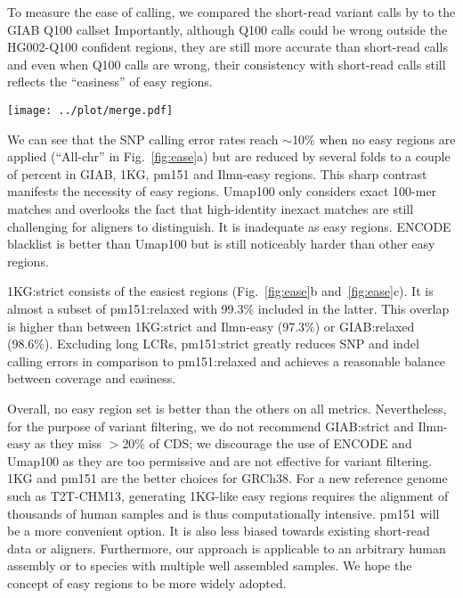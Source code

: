 \documentclass[webpdf,contemporary,large,namedate]{oup-authoring-template}%
\begin{document}
To measure the ease of calling, we compared the short-read variant calls by \citet{Baid2020.12.11.422022} to the GIAB Q100 callset
Importantly, although Q100 calls could be wrong outside the HG002-Q100 confident regions,
they are still more accurate than short-read calls
and even when Q100 calls are wrong, their consistency with short-read calls
still reflects the ``easiness'' of easy regions.

\begin{figure*}[tb]
\texttt{[image: ../plot/merge.pdf]}
\caption{Small variant calling accuracy in easy and confident regions.
{\bf (a)} SNP accuracy.
DeepVariant, Strelka2, Octopus and GATK short-read variant calls from 30X NovaSeq data were obtained from \citet{Baid2020.12.11.422022}.
Pipelup calls were made with ``{\tt minipileup -ys3 -a1 -p.25}''.
False discovery rate (FDR) and false negative rate (FNR) were calculated by RTG vcfeval~\citep{Cleary023754}
with genotype errors ignored.
``All-chr'' represents all chromosomal sequences in GRCh38 without easy regions.
{\bf (b)} SNP accuracy in high-quality easy regions.
{\bf (c)} Indel accuracy in high-quality easy regions.
Pileup indel calls are omitted due to their high error rates.
}\label{fig:ease}
\end{figure*}

We can see that the SNP calling error rates reach $\sim$10\% when no easy regions are applied (``All-chr'' in Fig.~\ref{fig:ease}a)
but are reduced by several folds to a couple of percent in GIAB, 1KG, pm151 and Ilmn-easy regions.
This sharp contrast manifests the necessity of easy regions.
Umap100 only considers exact 100-mer matches and overlooks the fact that high-identity inexact matches
are still challenging for aligners to distinguish.
It is inadequate as easy regions.
ENCODE blacklist is better than Umap100 but is still noticeably harder than other easy regions.

1KG:strict consists of the easiest regions (Fig.~\ref{fig:ease}b and~\ref{fig:ease}c).
It is almost a subset of pm151:relaxed with 99.3\% included in the latter.
This overlap is higher than between 1KG:strict and Ilmn-easy (97.3\%) or GIAB:relaxed (98.6\%).
Excluding long LCRs,
pm151:strict greatly reduces SNP and indel calling errors in comparison to pm151:relaxed
and achieves a reasonable balance between coverage and easiness.

Overall, no easy region set is better than the others on all metrics.
Nevertheless, for the purpose of variant filtering,
we do not recommend GIAB:strict and Ilmn-easy as they miss $>$20\% of CDS;
we discourage the use of ENCODE and Umap100 as they are too permissive
and are not effective for variant filtering.
1KG and pm151 are the better choices for GRCh38.
For a new reference genome such as T2T-CHM13, generating 1KG-like easy regions requires the alignment of thousands of human samples and is thus computationally intensive.
pm151 will be a more convenient option.
It is also less biased towards existing short-read data or aligners.
Furthermore, our approach is applicable to an arbitrary human assembly or to species with multiple well assembled samples.
We hope the concept of easy regions to be more widely adopted.
\end{document}
